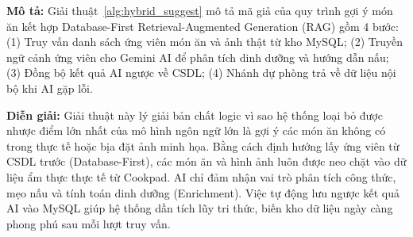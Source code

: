 \noindent\textbf{Mô tả:} Giải thuật~\ref{alg:hybrid_suggest} mô tả mã giả của quy trình gợi ý món ăn kết hợp Database-First Retrieval-Augmented Generation (RAG) gồm 4 bước: (1) Truy vấn danh sách ứng viên món ăn và ảnh thật từ kho MySQL; (2) Truyền ngữ cảnh ứng viên cho Gemini AI để phân tích dinh dưỡng và hướng dẫn nấu; (3) Đồng bộ kết quả AI ngược về CSDL; (4) Nhánh dự phòng trả về dữ liệu nội bộ khi AI gặp lỗi.

\noindent\textbf{Diễn giải:} Giải thuật này lý giải bản chất logic vì sao hệ thống loại bỏ được nhược điểm lớn nhất của mô hình ngôn ngữ lớn là gợi ý các món ăn không có trong thực tế hoặc bịa đặt ảnh minh họa. Bằng cách định hướng lấy ứng viên từ CSDL trước (Database-First), các món ăn và hình ảnh luôn được neo chặt vào dữ liệu ẩm thực thực tế từ Cookpad. AI chỉ đảm nhận vai trò phân tích công thức, mẹo nấu và tính toán dinh dưỡng (Enrichment). Việc tự động lưu ngược kết quả AI vào MySQL giúp hệ thống dần tích lũy tri thức, biến kho dữ liệu ngày càng phong phú sau mỗi lượt truy vấn.
